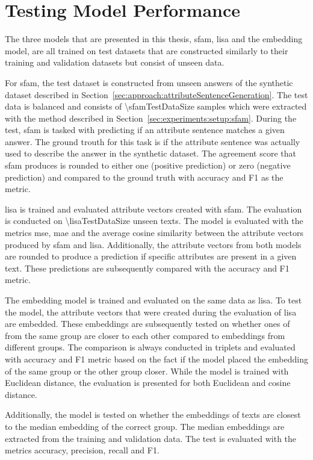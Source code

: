 \section{Testing Model Performance}
\label{sec:experiments:models}
The three models that are presented in this thesis, \ac{sfam}, \ac{lisa} and the embedding model, are all trained on test datasets that are constructed similarly to their training and validation datasets but consist of unseen data.

For \ac{sfam}, the test dataset is constructed from unseen answers of the synthetic dataset described in Section~\ref{sec:approach:attributeSentenceGeneration}. The test data is balanced and consists of \num{\sfamTestDataSize} samples which were extracted with the method described in Section~\ref{sec:experiments:setup:sfam}.
During the test, \ac{sfam} is tasked with predicting if an attribute sentence matches a given answer. The ground trouth for this task is if the attribute sentence was actually used to describe the answer in the synthetic dataset. The agreement score that \ac{sfam} produces is rounded to either one (positive prediction) or zero (negative prediction) and compared to the ground truth with accuracy and F1 as the metric.

\ac{lisa} is trained and evaluated attribute vectors created with \ac{sfam}. The evaluation is conducted on \num{\lisaTestDataSize} unseen texts. The model is evaluated with the metrics \ac{mse}, \ac{mae} and the average cosine similarity between the attribute vectors produced by \ac{sfam} and \ac{lisa}. Additionally, the attribute vectors from both models are rounded to produce a prediction if specific attributes are present in a given text. These predictions are subsequently compared with the accuracy and F1 metric.

The embedding model is trained and evaluated on the same data as \ac{lisa}. To test the model, the attribute vectors that were created during the evaluation of \ac{lisa} are embedded. These embeddings are subsequently tested on whether ones of from the same group are closer to each other compared to embeddings from different groups. The comparison is always conducted in triplets and evaluated with accuracy and F1 metric based on the fact if the model placed the embedding of the same group or the other group closer. While the model is trained with Euclidean distance, the evaluation is presented for both Euclidean and cosine distance.

Additionally, the model is tested on whether the embeddings of texts are closest to the median embedding of the correct group. The median embeddings are extracted from the training and validation data. The test is evaluated with the metrics accuracy, precision, recall and F1. %

